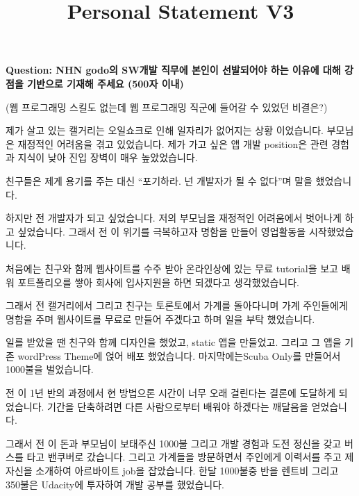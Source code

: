 \documentclass[12pt]{article}
\begin{document}
\title{Personal Statement V3}
\maketitle

\textbf{Question: NHN godo의 SW개발 직무에 본인이 선발되어야 하는 이유에 대해 강점을 기반으로 기재해 주세요 (500자 이내)}

\bigskip

(웹 프로그래밍 스킬도 없는데 웹 프로그래밍 직군에 들어갈 수 있었던 비결은?)

\bigskip

제가 살고 있는 캘거리는 오일쇼크로 인해 일자리가 없어지는 상황 이었습니다. 부모님은 재정적인 어려움을 겪고 있었습니다. 제가 가고 싶은 앱 개발 position은 관련 경험과 지식이 낮아 진입 장벽이 매우 높았었습니다.

\bigskip

친구들은 제게 용기를 주는 대신 “포기하라. 넌 개발자가 될 수 없다”며 말을 했었습니다.

\bigskip

하지만 전 개발자가 되고 싶었습니다. 저의 부모님을 재정적인 어려움에서 벗어나게 하고 싶었습니다. 그래서 전 이 위기를 극복하고자 명함을 만들어 영업활동을 시작했었습니다.

\bigskip

처음에는 친구와 함께 웹사이트를 수주 받아 온라인상에 있는 무료 tutorial을 보고 배워 포트폴리오를 쌓아 회사에 입사지원을 하면 되겠다고 생각했었습니다.

\bigskip

그래서 전 캘거리에서 그리고 친구는 토론토에서 가계를 돌아다니며 가계 주인들에게 명함을 주며 웹사이트를 무료로 만들어 주겠다고 하며 일을 부탁 했었습니다.

\bigskip

일를 받았을 땐 친구와 함께 디자인을 했었고, static 앱을 만들었고. 그리고 그 앱을 기존 wordPress Theme에 얹어 배포 했었습니다. 마지막에는Scuba Only를 만들어서 1000불을 벌었습니다.

\bigskip

전 이 1년 반의 과정에서 현 방법으론 시간이 너무 오래 걸린다는 결론에 도달하게 되었습니다. 기간을 단축하려면 다른 사람으로부터 배워야 하겠다는 깨달음을 얻었습니다.

\bigskip

그래서 전 이 돈과 부모님이 보태주신 1000불 그리고 개발 경험과 도전 정신을 갖고 버스를 타고 밴쿠버로 갔습니다. 그리고 가계들을 방문하면서 주인에게 이력서를 주고 제 자신을 소개하여 아르바이트 job을 잡았습니다. 한달 1000불중 반을 렌트비 그리고 350불은 Udacity에 투자하여 개발 공부를 했었습니다.
\end{document}
